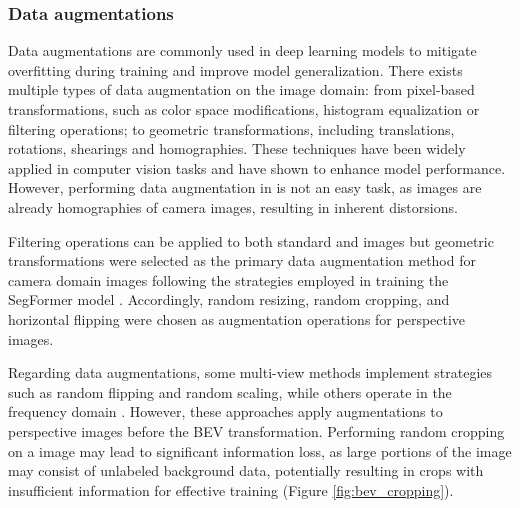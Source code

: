 \subsubsection{Data augmentations}
\label{data_augmentations}
Data augmentations are commonly used in deep learning models to mitigate overfitting during training and improve model generalization. There exists multiple types of data augmentation on the image domain: from pixel-based transformations, such as color space modifications, histogram equalization or filtering operations; to geometric transformations, including translations, rotations, shearings and homographies. These techniques have been widely applied in computer vision tasks and have shown to enhance model performance. However, performing data augmentation in  is not an easy task, as  images are already homographies of camera images, resulting in inherent distorsions.

Filtering operations can be applied to both standard and  images but geometric transformations were selected as the primary data augmentation method for camera domain images following the strategies employed in training the SegFormer model \cite{segformer}. Accordingly, random resizing, random cropping, and horizontal flipping were chosen as augmentation operations for perspective images.

Regarding  data augmentations, some multi-view methods implement strategies such as random flipping and random scaling, while others operate in the frequency domain \cite{HSDA}. However, these approaches apply augmentations to perspective images before the BEV transformation. Performing random cropping on a  image may lead to significant information loss, as large portions of the image may consist of unlabeled background data, potentially resulting in crops with insufficient information for effective training (Figure \ref{fig:bev_cropping}). 

